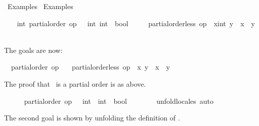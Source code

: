 %
\begin{isabellebody}%
\def\isabellecontext{Examples{\isadigit{2}}}%
%
\isadelimtheory
%
\endisadelimtheory
%
\isatagtheory
{}\isamarkupfalse%
\ Examples{}\isanewline
{}\ Examples\isanewline
{}%
\endisatagtheory
{\isafoldtheory}%
%
\isadelimtheory
%
\endisadelimtheory
%
\begin{isamarkuptext}%
\vspace{-5ex}%
\end{isamarkuptext}%
\isamarkuptrue%
%
\isadelimvisible
\ \ %
\endisadelimvisible
%
\isatagvisible
{}\isamarkupfalse%
\ int{\isacharcolon}\ partial{\isacharunderscore}order\ {\isachardoublequoteopen}op\ {\isasymle}\ {\isacharcolon}{\isacharcolon}\ {\isacharbrackleft}int{\isacharcomma}\ int{\isacharbrackright}\ {\isasymRightarrow}\ bool{\isachardoublequoteclose}\isanewline
\ \ \ \ \ {\isachardoublequoteopen}partial{\isacharunderscore}order{\isachardot}less\ op\ {\isasymle}\ {\isacharparenleft}x{\isacharcolon}{\isacharcolon}int{\isacharparenright}\ y\ {\isacharequal}\ {\isacharparenleft}x\ {\isacharless}\ y{\isacharparenright}{\isachardoublequoteclose}\isanewline
\ \ \isamarkupfalse%
\ {\isacharminus}%
\begin{isamarkuptxt}%
\normalsize The goals are now:
      \begin{isabelle}%
\ {}{\isachardot}\ partial{\isacharunderscore}order\ op\ {\isasymle}\isanewline
\ {}{\isachardot}\ partial{\isacharunderscore}order{\isachardot}less\ op\ {\isasymle}\ x\ y\ {\isacharequal}\ {\isacharparenleft}x\ {\isacharless}\ y{\isacharparenright}%
\end{isabelle}
      The proof that~\isa{{\isasymle}} is a partial order is as above.%
\end{isamarkuptxt}%
\isamarkuptrue%
\ \ \ \ \isamarkupfalse%
\ {\isachardoublequoteopen}partial{\isacharunderscore}order\ {\isacharparenleft}op\ {\isasymle}\ {\isacharcolon}{\isacharcolon}\ int\ {\isasymRightarrow}\ int\ {\isasymRightarrow}\ bool{\isacharparenright}{\isachardoublequoteclose}\isanewline
\ \ \ \ \ \ \isamarkupfalse%
\ unfold{\isacharunderscore}locales\ auto%
\begin{isamarkuptxt}%
\normalsize The second goal is shown by unfolding the
      definition of .%
\end{isamarkuptxt}%
\isamarkuptrue%
\ \ \ \ \isamarkupfalse%

\end{isabellebody}
